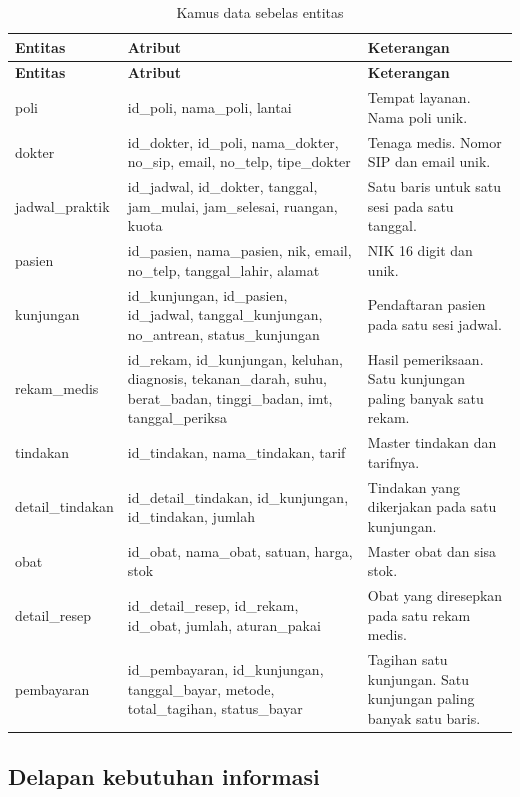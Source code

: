 \documentclass[12pt,a4paper]{article}
\begin{document}
\begin{longtable}{@{}p{3.1cm}p{5.4cm}p{7.4cm}@{}}
\caption{Kamus data sebelas entitas}
\label{tab:kamusdata}\\
\toprule
\textbf{Entitas} & \textbf{Atribut} & \textbf{Keterangan} \\
\midrule
\endfirsthead
\toprule
\textbf{Entitas} & \textbf{Atribut} & \textbf{Keterangan} \\
\midrule
\endhead
poli & id\_poli, nama\_poli, lantai & Tempat layanan. Nama poli unik. \\
dokter & id\_dokter, id\_poli, nama\_dokter, no\_sip, email, no\_telp, tipe\_dokter & Tenaga medis. Nomor SIP dan email unik. \\
jadwal\_praktik & id\_jadwal, id\_dokter, tanggal, jam\_mulai, jam\_selesai, ruangan, kuota & Satu baris untuk satu sesi pada satu tanggal. \\
pasien & id\_pasien, nama\_pasien, nik, email, no\_telp, tanggal\_lahir, alamat & NIK 16 digit dan unik. \\
kunjungan & id\_kunjungan, id\_pasien, id\_jadwal, tanggal\_kunjungan, no\_antrean, status\_kunjungan & Pendaftaran pasien pada satu sesi jadwal. \\
rekam\_medis & id\_rekam, id\_kunjungan, keluhan, diagnosis, tekanan\_darah, suhu, berat\_badan, tinggi\_badan, imt, tanggal\_periksa & Hasil pemeriksaan. Satu kunjungan paling banyak satu rekam. \\
tindakan & id\_tindakan, nama\_tindakan, tarif & Master tindakan dan tarifnya. \\
detail\_tindakan & id\_detail\_tindakan, id\_kunjungan, id\_tindakan, jumlah & Tindakan yang dikerjakan pada satu kunjungan. \\
obat & id\_obat, nama\_obat, satuan, harga, stok & Master obat dan sisa stok. \\
detail\_resep & id\_detail\_resep, id\_rekam, id\_obat, jumlah, aturan\_pakai & Obat yang diresepkan pada satu rekam medis. \\
pembayaran & id\_pembayaran, id\_kunjungan, tanggal\_bayar, metode, total\_tagihan, status\_bayar & Tagihan satu kunjungan. Satu kunjungan paling banyak satu baris. \\
\bottomrule
\end{longtable}

\subsection{Delapan kebutuhan informasi}
\end{document}
